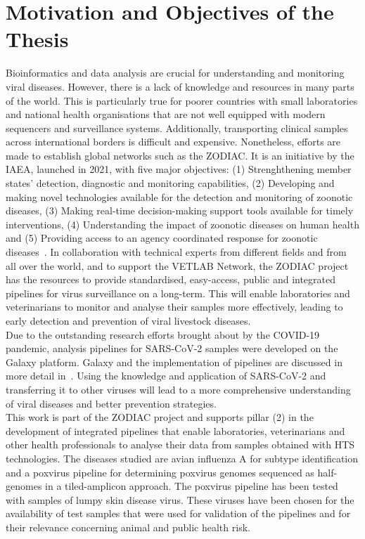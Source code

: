 \section{Motivation and Objectives of the Thesis}
Bioinformatics and data analysis are crucial for understanding and monitoring viral diseases. However, there is a lack of knowledge and resources in many parts of the world. This is particularly true for poorer countries with small laboratories and national health organisations that are not well equipped with modern sequencers and surveillance systems. Additionally, transporting clinical samples across international borders is difficult and expensive. Nonetheless, efforts are made to establish global networks such as the \ac{ZODIAC}. It is an initiative by the \ac{IAEA}, launched in 2021, with five major objectives: (1) Strenghthening member states' detection, diagnostic and monitoring capabilities, (2) Developing and making novel technologies available for the detection and monitoring of zoonotic diseases, (3) Making real-time decision-making support tools available for timely interventions, (4) Understanding the impact of zoonotic diseases on human health and (5) Providing access to an agency coordinated response for zoonotic diseases~\cite{zodiac2021}. In collaboration with technical experts from different fields and from all over the world, and to support the \ac{VETLAB} Network, the \ac{ZODIAC} project has the resources to provide standardised, easy-access, public and integrated pipelines for virus surveillance on a long-term. This will enable laboratories and veterinarians to monitor and analyse their samples more effectively, leading to early detection and prevention of viral livestock diseases. \\
Due to the outstanding research efforts brought about by the \ac{COVID-19} pandemic, analysis pipelines for \ac{SARS-CoV-2} samples were developed on the Galaxy platform. Galaxy and the implementation of pipelines are discussed in more detail in~. Using the knowledge and application of \ac{SARS-CoV-2} and transferring it to other viruses will lead to a more comprehensive understanding of viral diseases and better prevention strategies. \\
This work is part of the \ac{ZODIAC} project and supports pillar (2) in the development of integrated pipelines that enable laboratories, veterinarians and other health professionals to analyse their data from samples obtained with \ac{HTS} technologies. The diseases studied are avian influenza A for subtype identification and a poxvirus pipeline for determining poxvirus genomes sequenced as half-genomes in a tiled-amplicon approach. The poxvirus pipeline has been tested with samples of lumpy skin disease virus. These  viruses have been chosen for the availability of test samples that were used for validation of the pipelines and for their relevance concerning animal and public health risk. \\
